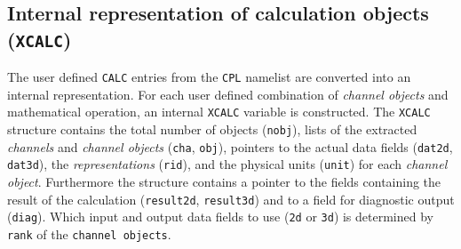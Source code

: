 \documentclass[twoside]{article}
\begin{document}
\subsection{Internal representation of calculation objects ({\tt XCALC})}
\label{sec:internalrepresentationcalc}
%
The user defined {\tt CALC} entries from the {\tt CPL} namelist are converted into an internal representation.
For each user defined combination of {\it channel objects} and mathematical operation, an internal {\tt XCALC} variable is constructed.
The {\tt XCALC} structure contains the total number of objects ({\tt nobj}), lists of the extracted {\it channels} and {\it channel objects} ({\tt cha}, {\tt obj}), pointers to the actual data fields ({\tt dat2d}, {\tt dat3d}), the {\it representations} ({\tt rid}), and the physical units ({\tt unit}) for each {\it channel object}.
Furthermore the structure contains a pointer to the fields containing the result of the calculation ({\tt result2d}, {\tt result3d}) and to a field for diagnostic output ({\tt diag}).
Which input and output data fields to use ({\tt *2d} or {\tt *3d}) is determined by {\tt rank} of the {\tt channel objects}.
%
\end{document}
